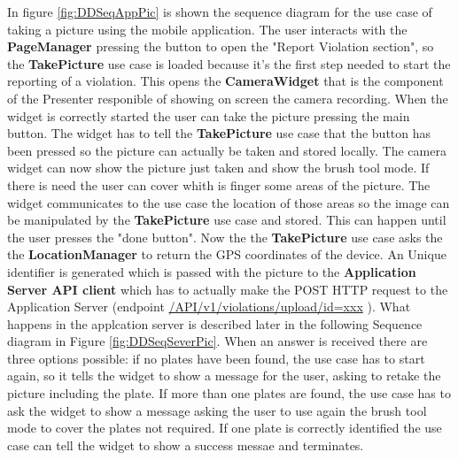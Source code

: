 In figure \ref{fig:DDSeqAppPic} is shown the sequence diagram for the use case of taking a picture using the mobile application.
The user interacts with the \textbf{PageManager} pressing the button to open the "Report Violation section", so the \textbf{TakePicture} use case is loaded because it's the first step needed to start the reporting of a violation. This opens the \textbf{CameraWidget} that is the component of the Presenter responible of showing on screen the camera recording. When the widget is correctly started the user can take the picture pressing the main button. The widget has to tell the \textbf{TakePicture} use case that the button has been pressed so the picture can  actually be taken and stored locally. The camera widget can now show the picture just taken and show the brush tool mode. If there is need the user can cover whith is finger some areas of the picture. The widget communicates to the use case the location of those areas so the image can be manipulated by the \textbf{TakePicture} use case and stored. This can happen until the user presses the "done button". Now the the \textbf{TakePicture} use case asks the the \textbf{LocationManager} to return the GPS coordinates of the device. An Unique identifier is generated which is passed with the picture to the \textbf{Application Server API client} which has to actually make the POST HTTP request to the Application Server (endpoint \url{/API/v1/violations/upload/id=xxx} ). What happens in the applcation server is described later in the following Sequence diagram in Figure \ref{fig:DDSeqSeverPic}.
When an answer is received there are three options possible: if no plates have been found, the use case has to start again, so it tells the widget to show a message for the user, asking to retake the picture including the plate.
If more than one plates are found, the use case has to ask the widget to show a message asking the user to use again the brush tool mode to cover the plates not required. If one plate is correctly identified the use case can tell the widget to show a success messae and terminates. %

